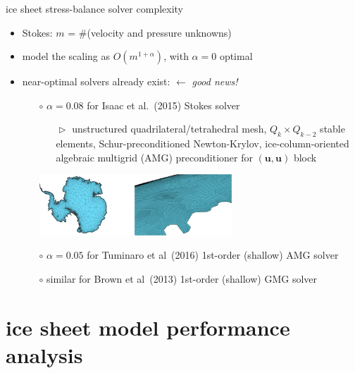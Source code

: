 \documentclass[svgnames,
               hyperref={colorlinks,citecolor=DeepPink4,linkcolor=FireBrick,urlcolor=Maroon},
               usepdftitle=false]  %
               {beamer}
\newcommand{\bu}{\mathbf{u}}
\begin{document}
\begin{frame}{ice sheet stress-balance solver complexity}

\begin{itemize}
\item Stokes: \quad $m$ = \#(velocity and pressure unknowns)
\item model the scaling as $O(m^{1+\alpha})$, with $\alpha=0$ optimal
\item \alert{near-optimal solvers} already exist: \hfill $\leftarrow$ \emph{good news!}
    \begin{itemize}
    \item[$\circ$] $\alpha=0.08$ for Isaac et al.~(2015) Stokes solver
        \begin{itemize}
        \item[$\vartriangleright$] unstructured quadrilateral/tetrahedral mesh, $Q_k\times Q_{k-2}$ stable elements, Schur-preconditioned Newton-Krylov, ice-column-oriented algebraic multigrid (AMG) preconditioner for $(\bu,\bu)$ block
        \end{itemize}

\begin{center}
\includegraphics[width=0.6\textwidth]{../images/isaac-antarctica.png}
\end{center}
    \item[$\circ$] $\alpha=0.05$ for Tuminaro et al~(2016) 1st-order (shallow) AMG solver
    \item[$\circ$] similar for Brown et al~(2013) 1st-order (shallow) GMG solver
    \end{itemize}
\end{itemize}
\end{frame}



\section{ice sheet model performance analysis}
\end{document}
